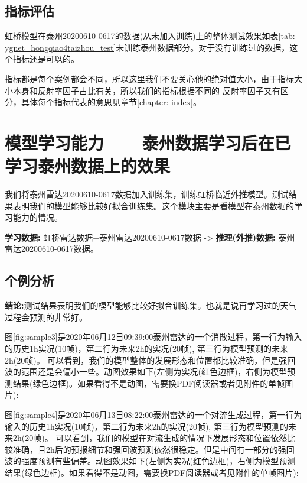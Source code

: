 \documentclass[10pt,english, openany]{book}
\begin{document}
\subsection{指标评估}

虹桥模型在泰州20200610-0617的数据(从未加入训练)上的整体测试效果如表\ref{tab: ygnet_hongqiao4taizhou_test}未训练泰州数据部分。对于没有训练过的数据，这个指标还是可以的。

指标都是每个案例都会不同，所以这里我们不要关心他的绝对值大小，由于指标大小本身和反射率因子占比有关，所以我们的指标根据不同的
反射率因子又有区分，具体每个指标代表的意思见章节\ref{chapter: index}。

\section{模型学习能力——泰州数据学习后在已学习泰州数据上的效果} \label{sec: model_learn}

我们将泰州雷达20200610-0617数据加入训练集，训练虹桥临近外推模型。测试结果表明我们的模型能够比较好拟合训练集。这个模块主要是看模型在泰州数据的学习能力的情况。

\textbf{学习数据:} 虹桥雷达数据+泰州雷达20200610-0617数据 -> \textbf{推理(外推)数据:} 泰州雷达20200610-0617数据。

\subsection{个例分析}

\textbf{结论:}测试结果表明我们的模型能够比较好拟合训练集。也就是说再学习过的天气过程会预测的非常好。

图\ref{fig:sample3}是2020年06月12日09:39:00泰州雷达的一个消散过程，第一行为输入的历史1h实况(10帧)，第二行为未来2h的实况(20帧), 第三行为模型预测的未来2h(20帧)。
可以看到，我们的模型整体的发展形态和位置都比较准确，但是强回波的范围还是会偏小一些。动图效果如下(左侧为实况(红色边框)，右侧为模型预测结果(绿色边框)。如果看得不是动图，需要换PDF阅读器或者见附件的单帧图片):

\begin{center}
\end{center}

图\ref{fig:sample4}是2020年06月13日08:22:00泰州雷达的一个对流生成过程，第一行为输入的历史1h实况(10帧)，第二行为未来2h的实况(20帧), 第三行为模型预测的未来2h(20帧)。
可以看到，我们的模型在对流生成的情况下发展形态和位置依然比较准确，且2h后的预报细节和强回波预测依然很稳定。但是中间有一部分的强回波的强度预测有些偏差。动图效果如下(左侧为实况(红色边框)，右侧为模型预测结果(绿色边框)。如果看得不是动图，需要换PDF阅读器或者见附件的单帧图片):
\end{document}
